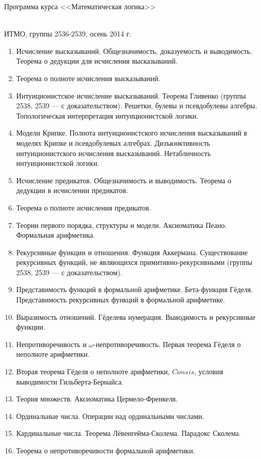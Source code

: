 \documentclass[12pt,a4paper,oneside]{book}
\begin{document}
\begin{center}
\begin{Large}Программа курса <<Математическая логика>>\end{Large}\\
ИТМО, группы 2536-2539, осень 2014 г.
\end{center}

\begin{enumerate}
\item Исчисление высказываний. Общезначимость, доказуемость и выводимость. Теорема о дедукции для исчисления высказываний.
\item Теорема о полноте исчисления высказываний.
\item Интуиционистское исчисление высказываний. Теорема Гливенко (группы 2538, 2539 --- с доказательством). 
Решетки, булевы и псевдобулевы алгебры. Топологическая интерпретация интуиционистской логики.
\item Модели Крипке. Полнота интуиционистского исчисления высказываний в моделях Крипке и 
псевдобулевых алгебрах. Дизъюнктивность интуиционистского исчисления высказываний. Нетабличность интуиционистской логики.
\item Исчисление предикатов. Общезначимость и выводимость. Теорема о дедукции в исчислении предикатов.
\item Теорема о полноте исчисления предикатов.
\item Теории первого порядка, структуры и модели. Аксиоматика Пеано. Формальная арифметика. 
\item Рекурсивные функции и отношения. Функция Аккермана. Существование рекурсивных функций,
не являющихся примитивно-рекурсивными (группы 2538, 2539 --- с доказательством). 
\item Представимость функций в формальной арифметике. Бета-функция Гёделя. 
Представимость рекурсивных функций в формальной арифметике.
\item Выразимость отношений. Гёделева нумерация. Выводимость и рекурсивные функции.
\item Непротиворечивость и $\omega$-непротиворечивость. Первая теорема Гёделя о неполноте арифметики.
\item Вторая теорема Гёделя о неполноте арифметики, $Consis$, условия выводимости Гильберта-Бернайса.
\item Теория множеств. Аксиоматика Цермело-Френкеля.
\item Ординальные числа. Операции над ординальными числами. 
\item Кардинальные числа. Теорема Лёвенгейма-Сколема. Парадокс Сколема.
\item Теорема о непротиворечивости формальной арифметики.
\end{enumerate}
\end{document}
